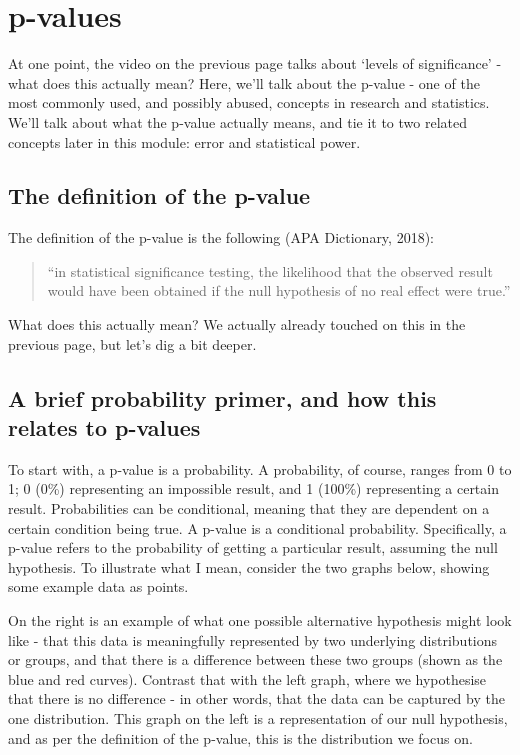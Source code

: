 \documentclass[
]{book}
\begin{document}
\hypertarget{p-values}{%
\section{p-values}\label{p-values}}

At one point, the video on the previous page talks about `levels of significance' - what does this actually mean? Here, we'll talk about the p-value - one of the most commonly used, and possibly abused, concepts in research and statistics. We'll talk about what the p-value actually means, and tie it to two related concepts later in this module: error and statistical power.

\hypertarget{the-definition-of-the-p-value}{%
\subsection{The definition of the p-value}\label{the-definition-of-the-p-value}}

The definition of the p-value is the following (APA Dictionary, 2018):

\begin{quote}
``in statistical significance testing, the likelihood that the observed result would have been obtained if the null hypothesis of no real effect were true.''
\end{quote}

What does this actually mean? We actually already touched on this in the previous page, but let's dig a bit deeper.

\hypertarget{a-brief-probability-primer-and-how-this-relates-to-p-values}{%
\subsection{A brief probability primer, and how this relates to p-values}\label{a-brief-probability-primer-and-how-this-relates-to-p-values}}

To start with, a p-value is a probability. A probability, of course, ranges from 0 to 1; 0 (0\%) representing an impossible result, and 1 (100\%) representing a certain result. Probabilities can be conditional, meaning that they are dependent on a certain condition being true. A p-value is a conditional probability. Specifically, a p-value refers to the probability of getting a particular result, assuming the null hypothesis. To illustrate what I mean, consider the two graphs below, showing some example data as points.

On the right is an example of what one possible alternative hypothesis might look like - that this data is meaningfully represented by two underlying distributions or groups, and that there is a difference between these two groups (shown as the blue and red curves). Contrast that with the left graph, where we hypothesise that there is no difference - in other words, that the data can be captured by the one distribution. This graph on the left is a representation of our null hypothesis, and as per the definition of the p-value, this is the distribution we focus on.
\end{document}
